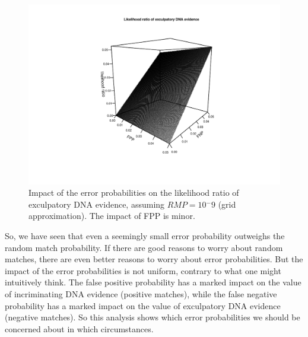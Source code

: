 \documentclass[
  letterpaper,
  DIV=11,
  numbers=noendperiod]{scrartcl}
\begin{document}
\begin{figure}[t]

{\centering \includegraphics[width=1\textwidth,height=\textheight]{Quart_lr-chapter6_files/figure-pdf/fig-fpfnplr-exc-1.pdf}

}

\caption{\label{fig-fpfnplr-exc}Impact of the error probabilities on the
likelihood ratio of exculpatory DNA evidence, assuming \(RMP=10{^-9}\)
(grid approximation). The impact of FPP is minor.}

\end{figure}

So, we have seen that even a seemingly small error probability outweighs
the random match probability. If there are good reasons to worry about
random matches, there are even better reasons to worry about error
probabilities. But the impact of the error probabilities is not uniform,
contrary to what one might intuitively think. The false positive
probability has a marked impact on the value of incriminating DNA
evidence (positive matches), while the false negative probability has a
marked impact on the value of exculpatory DNA evidence (negative
matches). So this analysis shows which error probabilities we should be
concerned about in which circumstances.
\end{document}
